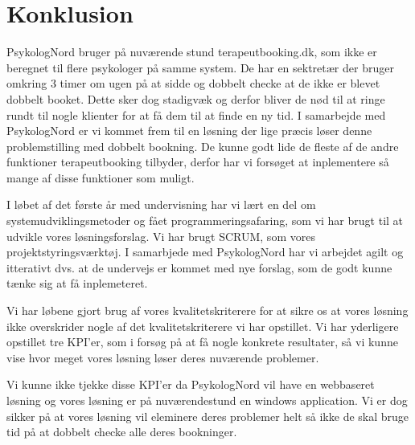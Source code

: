 \section{Konklusion}
PsykologNord bruger på nuværende stund terapeutbooking.dk, som ikke er beregnet til flere psykologer på samme system.
De har en sektretær der bruger omkring 3 timer om ugen på at sidde og dobbelt checke at de ikke er blevet dobbelt booket.
Dette sker dog stadigvæk og derfor bliver de nød til at ringe rundt til nogle klienter for at få dem til at finde en ny tid.
I samarbejde med PsykologNord er vi kommet frem til en løsning der lige præcis løser denne problemstilling med dobbelt bookning.
De kunne godt lide de fleste af de andre funktioner terapeutbooking tilbyder, derfor har vi forsøget at inplementere så mange af disse funktioner som muligt.


I løbet af det første år med undervisning har vi lært en del om systemudviklingsmetoder og fået programmeringsafaring, som vi har brugt til at udvikle vores løsningsforslag. Vi har brugt SCRUM, som vores projektstyringsværktøj.
I samarbjede med PsykologNord har vi arbejdet agilt og itterativt dvs. at de undervejs er kommet med nye forslag, som de godt kunne tænke sig at få inplemeteret.

Vi har løbene gjort brug af vores kvalitetskriterere for at sikre os at vores løsning ikke overskrider nogle af det kvalitetskriterere vi har opstillet.
Vi har yderligere opstillet tre KPI'er, som i forsøg på at få nogle konkrete resultater, så vi kunne vise hvor meget vores løsning løser deres nuværende problemer.

Vi kunne ikke tjekke disse KPI'er da PsykologNord vil have en webbaseret løsning og vores løsning er på nuværendestund en windows application. Vi er dog sikker på at vores løsning vil eleminere deres problemer helt så ikke de skal bruge tid på at dobbelt checke alle deres bookninger.



